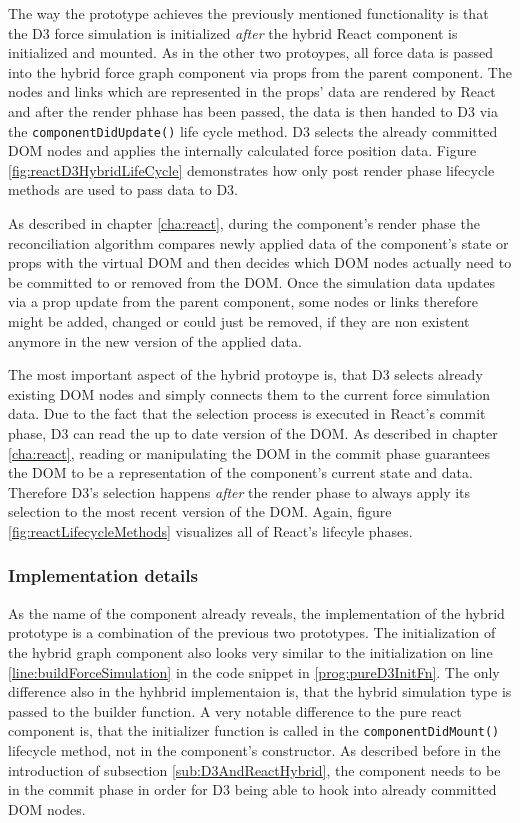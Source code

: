 The way the prototype achieves the previously mentioned functionality is that the D3 force simulation is initialized \emph{after} the hybrid React component is initialized and mounted. As in the other two protoypes, all force data is passed into the hybrid force graph component via props from the parent component. The nodes and links which are represented in the props' data are rendered by React and after the render phhase has been passed, the data is then handed to D3 via the \texttt{componentDidUpdate()} life cycle method. D3 selects the already committed DOM nodes and applies the internally calculated force position data. Figure \ref{fig:reactD3HybridLifeCycle} demonstrates how only post render phase lifecycle methods are used to pass data to D3.

As described in chapter \ref{cha:react}, during the component's render phase the reconciliation algorithm compares newly applied data of the component's state or props with the virtual DOM and then decides which DOM nodes actually need to be committed to or removed from the DOM. Once the simulation data updates via a prop update from the parent component, some nodes or links therefore might be added, changed or could just be removed, if they are non existent anymore in the new version of the applied data.

The most important aspect of the hybrid protoype is, that D3 selects already existing DOM nodes and simply connects them to the current force simulation data. Due to the fact that the selection process is executed in React's commit phase, D3 can read the up to date version of the DOM. As described in chapter \ref{cha:react}, reading or manipulating the DOM in the commit phase guarantees the DOM to be a representation of the component's current state and data. Therefore D3's selection happens \emph{after} the render phase to always apply its selection to the most recent version of the DOM. Again, figure \ref{fig:reactLifecycleMethods} visualizes all of React's lifecyle phases.

\subsubsection{Implementation details}

As the name of the component already reveals, the implementation of the hybrid prototype is a combination of the previous two prototypes. The initialization of the hybrid graph component also looks very similar to the initialization on line \ref{line:buildForceSimulation} in the code snippet in \ref{prog:pureD3InitFn}. The only difference also in the hyhbrid implementaion is, that the hybrid simulation type is passed to the builder function. A very notable difference to the pure react component is, that the initializer function is called in the \texttt{componentDidMount()} lifecycle method, not in the component's constructor. As described before in the introduction of subsection \ref{sub:D3AndReactHybrid}, the component needs to be in the commit phase in order for D3 being able to hook into already committed DOM nodes.

